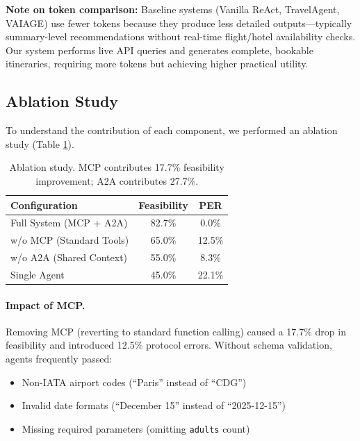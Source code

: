 \documentclass[conference]{IEEEtran}
\begin{document}
\textbf{Note on token comparison:} Baseline systems (Vanilla ReAct, TravelAgent, VAIAGE) use fewer tokens because they produce less detailed outputs---typically summary-level recommendations without real-time flight/hotel availability checks. Our system performs live API queries and generates complete, bookable itineraries, requiring more tokens but achieving higher practical utility.

\subsection{Ablation Study}

To understand the contribution of each component, we performed an ablation study (Table \ref{tab:ablation}).

\begin{table}[h]
\centering
\begin{tabular}{lcc}
\toprule
\textbf{Configuration} & \textbf{Feasibility} & \textbf{PER} \\
\midrule
Full System (MCP + A2A) & 82.7\% & 0.0\% \\
w/o MCP (Standard Tools) & 65.0\% & 12.5\% \\
w/o A2A (Shared Context) & 55.0\% & 8.3\% \\
Single Agent & 45.0\% & 22.1\% \\
\bottomrule
\end{tabular}
\caption{Ablation study. MCP contributes 17.7\% feasibility improvement; A2A contributes 27.7\%.}
\label{tab:ablation}
\end{table}

\paragraph{Impact of MCP.}
Removing MCP (reverting to standard function calling) caused a 17.7\% drop in feasibility and introduced 12.5\% protocol errors. Without schema validation, agents frequently passed:
\begin{itemize}
    \item Non-IATA airport codes (``Paris'' instead of ``CDG'')
    \item Invalid date formats (``December 15'' instead of ``2025-12-15'')
    \item Missing required parameters (omitting \texttt{adults} count)
\end{itemize}
\end{document}
